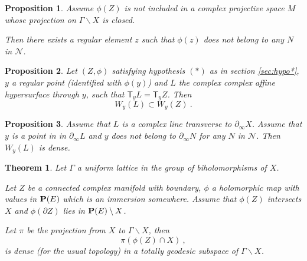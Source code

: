 \documentclass[10pt,a4paper]{amsart}
\newtheorem{proposition}{Proposition}
\newtheorem{theorem}{Theorem}
\newcommand{\T}{\ms T}
\newcommand{\bX}{\partial_\infty X}
\newcommand{\mc}{\mathcal}
\newcommand{\ms}{\mathsf}
\begin{document}
\begin{proposition}\label{pro:regnotin}
	Assume $\phi(Z)$ is not included in a complex projective space $M$ whose projection on $\Gamma\backslash X$ is closed.
	
	Then there exists a regular element $z$ such that $\phi(z)$ does not belong to any  $N$ in $\mathcal N$.
\end{proposition}

\begin{proposition}
	\label{pro:lem1} Let $(Z,\phi)$ satisfying hypothesis $(*)$ as in section \ref{sec:hypo*}, $y$ a regular point (identified with $\phi(y)$) and $L$ the complex complex affine hypersurface through $y$, such that $\T_yL=\T_y Z$. Then
$$
W_y(L)\subset W_y(Z)\ .	
$$
\end{proposition}

\begin{proposition}\label{pro:wldense}
	Assume that $L$ is a complex line  transverse to $\bX$. Assume that $y$ is a  point in  in $\partial_\infty L$ and $y$  does not belong to  $\partial_\infty N$ for any $N$ in $\mc N$.
	Then $W_y(L)$ is dense.
\end{proposition}

\begin{theorem}
	Let $\Gamma$ a uniform lattice in the group of biholomorphisms of $X$.
	
	Let $Z$ be a connected complex manifold with boundary, $\phi$ a holomorphic map with values in ${\bf P}(E)$ which is an immersion somewhere. Assume that $\phi(Z)$ intersects $X$ and  $\phi(\partial Z)$ lies in ${\bf P}(E)\setminus X$. 
	
Let $\pi$ be the projection from $X$ to $\Gamma\backslash X$, then  $$\pi(\phi(Z)\cap X)\ ,$$ is dense (for the usual topology) in a totally geodesic subspace of  $\Gamma\backslash X$.
\end{theorem}
\end{document}
